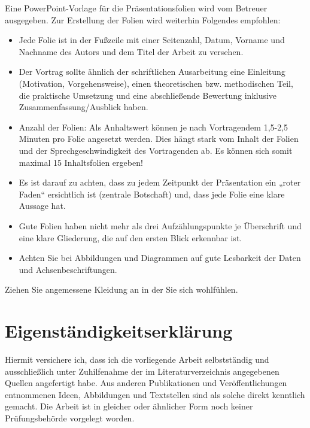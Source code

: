 \documentclass[utf8, a4paper, 11pt, parskip, pointlessnumbers]{scrreprt}
\begin{document}
Eine PowerPoint-Vorlage für die Präsentationsfolien wird vom Betreuer ausgegeben. Zur Erstellung der Folien wird weiterhin Folgendes empfohlen:
\begin{itemize}

\item Jede Folie ist in der Fußzeile mit einer Seitenzahl, Datum, Vorname und Nachname des Autors und dem Titel der Arbeit zu versehen.
\item Der Vortrag sollte ähnlich der schriftlichen Ausarbeitung eine Einleitung (Motivation, Vorgehensweise), einen theoretischen bzw. methodischen Teil, die praktische Umsetzung und eine abschließende Bewertung inklusive Zusammenfassung/Ausblick haben. 
\item Anzahl der Folien: Als Anhaltswert können je nach Vortragendem 1,5-2,5 Minuten pro Folie angesetzt werden. Dies hängt stark vom Inhalt der Folien und der Sprechgeschwindigkeit des Vortragenden ab. Es können sich somit maximal 15 Inhaltsfolien ergeben! 
\item Es ist darauf zu achten, dass zu jedem Zeitpunkt der Präsentation ein „roter Faden“ ersichtlich ist (zentrale Botschaft) und, dass jede Folie eine klare Aussage hat. 
 \item Gute Folien haben nicht mehr als drei Aufzählungspunkte je Überschrift und eine klare Gliederung, die auf den ersten Blick erkennbar ist. 
\item Achten Sie bei Abbildungen und Diagrammen auf gute Lesbarkeit der Daten und Achsenbeschriftungen. 
\end{itemize}
Ziehen Sie angemessene Kleidung an in der Sie sich wohlfühlen.


\pagebreak


\chapter*{Eigenständigkeitserklärung} 
Hiermit versichere ich, dass ich die vorliegende Arbeit selbstständig und ausschließlich unter Zuhilfenahme der im Literaturverzeichnis angegebenen Quellen angefertigt habe. Aus anderen Publikationen und Veröffentlichungen entnommenen Ideen, Abbildungen und Textstellen sind als solche direkt kenntlich gemacht. Die Arbeit ist in gleicher oder ähnlicher Form noch keiner Prüfungsbehörde vorgelegt worden. 
\end{document}
